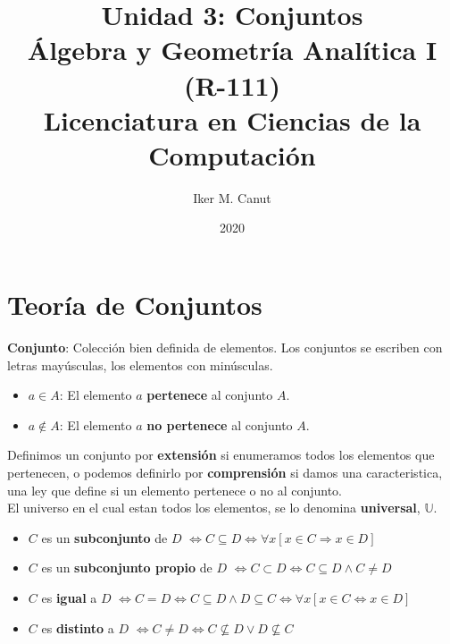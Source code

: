 \documentclass[11pt,a4paper]{article}
\author{Iker M. Canut}
\title{Unidad 3: Conjuntos\\\'Algebra y Geometr\'ia Anal\'itica I (R-111)\\Licenciatura en Ciencias de la Computaci\'on}
\date{2020}
\begin{document}
\maketitle
\newpage
\section{Teor\'ia de Conjuntos}
\noindent \textbf{Conjunto}: Colecci\'on bien definida de elementos. Los conjuntos se escriben con letras may\'usculas, los elementos con min\'usculas.
\begin{itemize}
\item $a \in A$: El elemento $a$ \textbf{pertenece} al conjunto $A$.
\item $a \not \in A$: El elemento $a$ \textbf{no pertenece} al conjunto $A$.
\end{itemize}
\noindent Definimos un conjunto por \textbf{extensi\'on} si enumeramos todos los elementos que pertenecen, o podemos definirlo por \textbf{comprensi\'on} si damos una caracteristica, una ley que define si un elemento pertenece o no al conjunto.\\

\noindent El universo en el cual estan todos los elementos, se lo denomina \textbf{universal}, $\mathbb{U}$.\\

\begin{itemize}
\item $C$ es un \textbf{subconjunto} de $D$ $\iff C \subseteq D \iff \forall x[x \in C \Rightarrow x \in D]$

\item $C$ es un \textbf{subconjunto propio} de $D$ $\iff C \subset D \iff C \subseteq D \land C \not = D$

\item $C$ es \textbf{igual} a $D$ $\iff C = D \iff C \subseteq D \land D \subseteq C \iff \forall x[x \in C \iff x \in D]$
\item $C$ es \textbf{distinto} a $D$ $\iff C \not = D \iff C \not \subseteq D \lor D \not \subseteq C$
\end{itemize}
\end{document}
